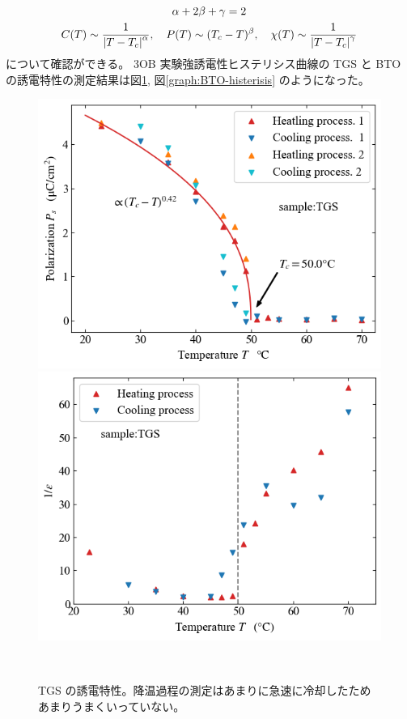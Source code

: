 \documentclass[9pt,dvipdfmx,a4paper]{jsarticle}
\begin{document}
\begin{gather}
    \alpha + 2\beta +\gamma = 2\\
    C(T) \sim \frac{1}{\abs{T-T_c}^\alpha},\quad
    P(T) \sim (T_c-T)^\beta,\quad
    \chi(T) \sim \frac{1}{\abs{T-T_c}^\gamma}
\end{gather}
について確認ができる。
3OB 実験強誘電性ヒステリシス曲線の TGS と BTO の誘電特性の測定結果は図\ref{graph:TGS-histerisis},
図\ref{graph:BTO-histerisis} のようになった。
\begin{figure}[hbt]
    \centering
    \begin{minipage}[t]{0.48\columnwidth}
        \centering
        \includegraphics[width = \columnwidth]{discussion/TGS_Ps-T.png}
    \end{minipage}
    \hfill
    \begin{minipage}[t]{0.48\columnwidth}
        \centering
        \includegraphics[width = \columnwidth]{discussion/TGS_epsilon1-T.png}
    \end{minipage}\\
    \caption{TGS の誘電特性。降温過程の測定はあまりに急速に冷却したためあまりうまくいっていない。}
    \label{graph:TGS-histerisis}


\end{figure}
\end{document}
